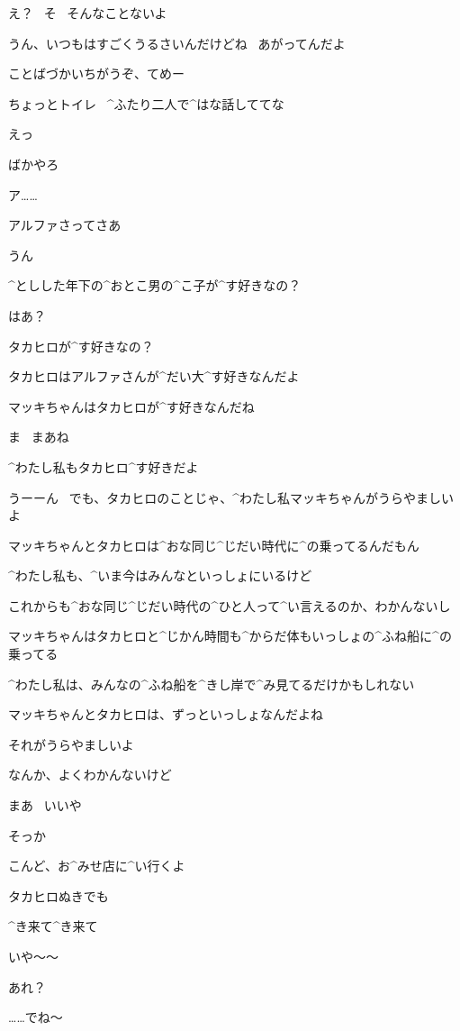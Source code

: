 \M え？
\ そ
\ そんなことないよ

\T うん、いつもはすごくうるさいんだけどね
\ あがってんだよ

\M ことばづかいちがうぞ、てめー

\T ちょっとトイレ
\ ^{ふたり}{二人}で^{はな}{話}しててな

\M えっ

\M ばかやろ

\page
\M ア……

\M アルファさってさあ

\A うん

\M ^{としした}{年下}の^{おとこ}{男}の^{こ}{子}が^{す}{好}きなの？

\A はあ？

\page
\M タカヒロが^{す}{好}きなの？

\M タカヒロはアルファさんが^{だい}{大}^{す}{好}きなんだよ

\A マッキちゃんはタカヒロが^{す}{好}きなんだね

\M ま
\ まあね

\A ^{わたし}{私}もタカヒロ^{す}{好}きだよ

\page
\A うーーん
\ でも、タカヒロのことじゃ、^{わたし}{私}マッキちゃんがうらやましいよ

\A マッキちゃんとタカヒロは^{おな}{同}じ^{じだい}{時代}に^{の}{乗}ってるんだもん

\A ^{わたし}{私}も、^{いま}{今}はみんなといっしょにいるけど

\A これからも^{おな}{同}じ^{じだい}{時代}の^{ひと}{人}って^{い}{言}えるのか、わかんないし

\A マッキちゃんはタカヒロと^{じかん}{時間}も^{からだ}{体}もいっしょの^{ふね}{船}に^{の}{乗}ってる

\A ^{わたし}{私}は、みんなの^{ふね}{船}を^{きし}{岸}で^{み}{見}てるだけかもしれない

\page
\A マッキちゃんとタカヒロは、ずっといっしょなんだよね

\A それがうらやましいよ

\M なんか、よくわかんないけど

\M まあ
\ いいや

\A そっか

\M こんど、お^{みせ}{店}に^{い}{行}くよ

\M タカヒロぬきでも

\A ^{き}{来}て^{き}{来}て

\page
\T いや〜〜

\T あれ？

\A ……でね〜

